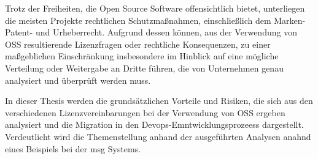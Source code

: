 Trotz der Freiheiten, die Open Source Software offensichtlich bietet, unterliegen die meisten Projekte rechtlichen Schutzmaßnahmen, einschließlich dem Marken- Patent- und Urheberrecht.
Aufgrund dessen können, aus der Verwendung von OSS resultierende Lizenzfragen oder rechtliche Konsequenzen, zu einer maßgeblichen Einschränkung insbesondere im Hinblick auf eine mögliche Verteilung oder Weitergabe an Dritte führen, die von Unternehmen genau analysiert und überprüft werden muss.  

In dieser Thesis werden die grundsätzlichen Vorteile und Risiken, die sich aus den verschiedenen Lizenzvereinbarungen bei der Verwendung von OSS ergeben analysiert und die Migration in den Devops-Emntwicklungsprozeess dargestellt.
Verdeutlicht wird die Themenstellung anhand der ausgeführten Analysen anahnd eines Beispiels bei der msg Systems.

